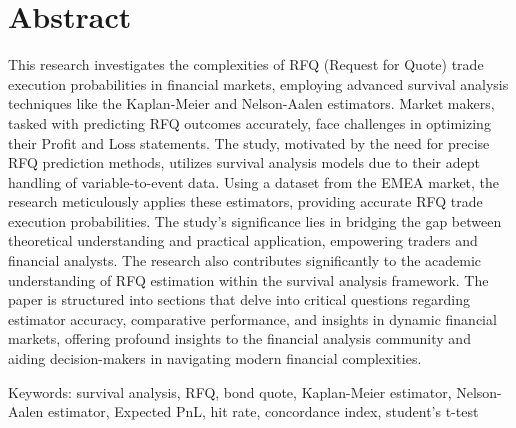 \chapter*{Abstract}
This research investigates the complexities of RFQ (Request for Quote) trade execution probabilities in financial markets, employing advanced survival analysis techniques like the Kaplan-Meier and Nelson-Aalen estimators. Market makers, tasked with predicting RFQ outcomes accurately, face challenges in optimizing their Profit and Loss statements. The study, motivated by the need for precise RFQ prediction methods, utilizes survival analysis models due to their adept handling of variable-to-event data. Using a dataset from the EMEA market, the research meticulously applies these estimators, providing accurate RFQ trade execution probabilities. The study's significance lies in bridging the gap between theoretical understanding and practical application, empowering traders and financial analysts. The research also contributes significantly to the academic understanding of RFQ estimation within the survival analysis framework. The paper is structured into sections that delve into critical questions regarding estimator accuracy, comparative performance, and insights in dynamic financial markets, offering profound insights to the financial analysis community and aiding decision-makers in navigating modern financial complexities.

Keywords: survival analysis, RFQ, bond quote, Kaplan-Meier estimator, Nelson-Aalen estimator, Expected PnL, hit rate, concordance index, student's t-test
